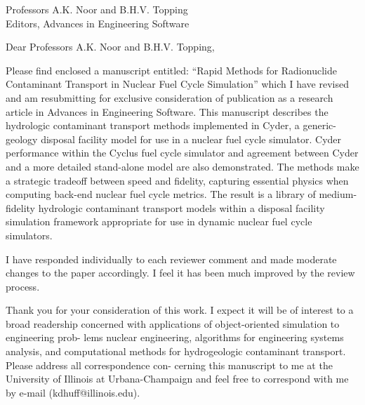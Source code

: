 \documentclass[11pt]{letter} %
\newcommand{\RecipientName}{Professors A.K. Noor and B.H.V. Topping\xspace}
\newcommand{\RecipientAddress}{Editors, Advances in Engineering Software\xspace}
\begin{document}
\begin{letter}{\RecipientName \\
        \RecipientAddress}

\address{Kathryn D. Huff\\
118 Talbot Laboratory\\
104 Wright Street\\
MC-234\\
Urbana, IL 61801}


\opening{Dear \RecipientName,}
Please find enclosed a manuscript entitled: ``Rapid Methods for Radionuclide Contaminant
Transport in Nuclear Fuel Cycle Simulation'' which I have revised and am resubmitting for exclusive consideration of publication as a research article in Advances in Engineering Software.
This manuscript describes the hydrologic contaminant transport methods implemented in
Cyder, a generic-geology disposal facility model for use in a nuclear fuel cycle simulator.
Cyder performance within the Cyclus fuel cycle simulator and agreement between Cyder and
a more detailed stand-alone model are also demonstrated. The methods make a strategic
tradeoff between speed and fidelity, capturing essential physics when computing back-end
nuclear fuel cycle metrics. The result is a library of medium-fidelity hydrologic contaminant
transport models within a disposal facility simulation framework appropriate for use in
dynamic nuclear fuel cycle simulators.

I have responded individually to each reviewer comment and made moderate changes to the paper accordingly. I feel it has been much improved by the review process. 

Thank you for your consideration of this work. I expect it will be of interest to a broad
readership concerned with applications of object-oriented simulation to engineering prob-
lems nuclear engineering, algorithms for engineering systems analysis, and computational
methods for hydrogeologic contaminant transport. Please address all correspondence con-
cerning this manuscript to me at the University of Illinois at Urbana-Champaign and feel
free to correspond with me by e-mail (kdhuff@illinois.edu).


\end{letter}
\end{document}
